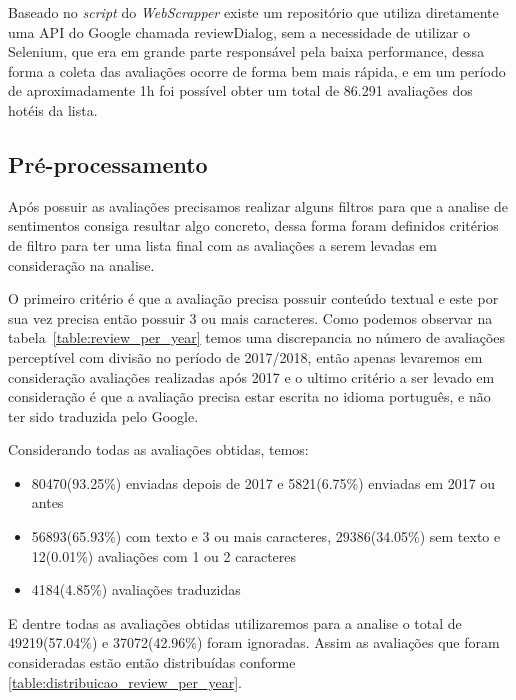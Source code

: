 Baseado no \emph{script} do \emph{WebScrapper} existe um repositório que utiliza diretamente uma API do Google chamada reviewDialog, sem a necessidade de utilizar o Selenium, que era em grande parte responsável pela baixa performance, dessa forma a coleta das avaliações ocorre de forma bem mais rápida, e em um período de aproximadamente 1h foi possível obter um total de 86.291 avaliações dos hotéis da lista.

\subsection{Pré-processamento}
\label{cap:metodologia:sec:conjunto_dados:sec:pre_processamento}

Após possuir as avaliações precisamos realizar alguns filtros para que a analise de sentimentos consiga resultar algo concreto, dessa forma foram definidos critérios de filtro para ter uma lista final com as avaliações a serem levadas em consideração na analise.

O primeiro critério é que a avaliação precisa possuir conteúdo textual e este por sua vez precisa então possuir 3 ou mais caracteres. Como podemos observar na tabela~\ref{table:review_per_year} temos uma discrepancia no número de avaliações perceptível com divisão no período de 2017/2018, então apenas levaremos em consideração avaliações realizadas após 2017 e o ultimo critério a ser levado em consideração é que a avaliação precisa estar escrita no idioma português, e não ter sido traduzida pelo Google.



Considerando todas as avaliações obtidas, temos:

\begin{itemize}
	\item 80470(93.25\%) enviadas depois de 2017 e 5821(6.75\%) enviadas em 2017 ou antes
	\item 56893(65.93\%) com texto e 3 ou mais caracteres, 29386(34.05\%) sem texto e 12(0.01\%) avaliações com 1 ou 2 caracteres
	\item 4184(4.85\%) avaliações traduzidas
\end{itemize}

E dentre todas as avaliações obtidas utilizaremos para a analise o total de 49219(57.04\%) e 37072(42.96\%) foram ignoradas. Assim as avaliações que foram consideradas estão então distribuídas conforme \ref{table:distribuicao_review_per_year}.



